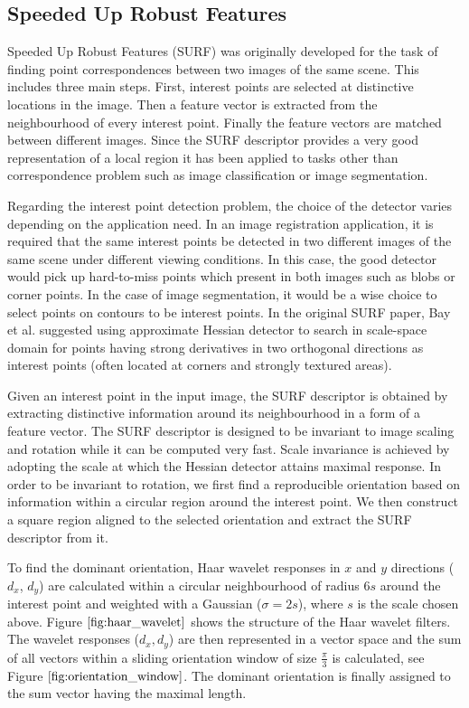 \documentclass{SMBV12}
\begin{document}
\subsection{Speeded Up Robust Features}
\label{sec:surf}
Speeded Up Robust Features (SURF) \cite{bay2006surf} was originally developed for the task of finding point correspondences between two images of the same scene. This includes three main steps. First, interest points are selected at distinctive locations in the image. Then a feature vector is extracted from the neighbourhood of every interest point. Finally the feature vectors are matched between different images. Since the SURF descriptor provides a very good representation of a local region it has been applied to tasks other than correspondence problem such as image classification or image segmentation.

Regarding the interest point detection problem, the choice of the detector varies depending on the application need. In an image registration application, it is required that the same interest points be detected in two different images of the same scene under different viewing conditions. In this case, the good detector would pick up hard-to-miss points which present in both images such as blobs or corner points. In the case of image segmentation, it would be a wise choice to select points on contours to be interest points. In the original SURF paper, Bay et al. suggested using approximate Hessian detector to search in scale-space domain for points having strong derivatives in two orthogonal directions as interest points (often located at corners and strongly textured areas).

Given an interest point in the input image, the SURF descriptor is obtained by extracting distinctive information around its neighbourhood in a form of a feature vector. The SURF descriptor is designed to be invariant to image scaling and rotation while it can be computed very fast. Scale invariance is achieved by adopting the scale at which the Hessian detector attains maximal response. In order to be invariant to rotation, we first find a reproducible orientation based on information within a circular region around the interest point. We then construct a square region aligned to the selected orientation and extract the SURF descriptor from it.

To find the dominant orientation, Haar wavelet responses in $x$ and $y$ directions ($d_x$, $d_y$) are calculated within a circular neighbourhood of radius $6s$ around the interest point and weighted with a Gaussian ($\sigma = 2s$), where $s$ is the scale chosen above. Figure $\ref{fig:haar_wavelet}$ shows the structure of the Haar wavelet filters. The wavelet responses ($d_x, d_y$) are then represented in a vector space and the sum of all vectors within a sliding orientation window of size $\frac{\pi}{3}$ is calculated, see Figure $\ref{fig:orientation_window}$. The dominant orientation is finally assigned to the sum vector having the maximal length.
\end{document}
